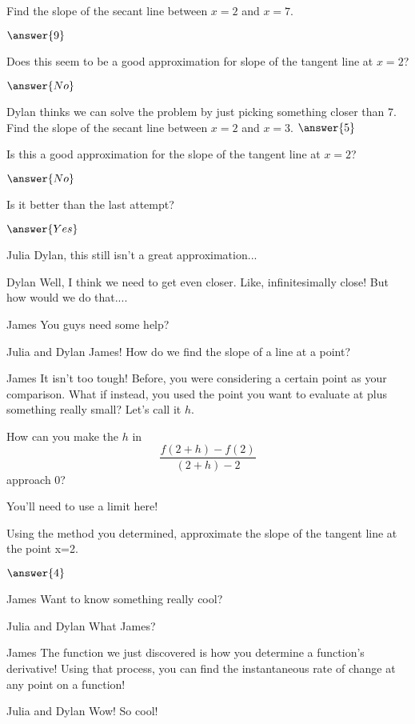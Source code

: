 \documentclass{ximera}
\begin{document}
\begin{question}
Find the slope of the secant line between $x = 2$ and $x = 7$.


$\answer{9}$

Does this seem to be a good approximation for slope of the tangent line at $x = 2$?

$\answer{No}$

Dylan thinks we can solve the problem by just picking something closer than 7. Find the slope of the secant line between $x = 2$ and $x = 3$.
$\answer{5}$

Is this a good approximation for the slope of the tangent line at $x=2$?

$\answer{No}$

Is it better than the last attempt?

$\answer{Yes}$
\end{question}
\begin{dialogue}
\item[Julia] Dylan, this still isn't a great approximation...
\item[Dylan] Well, I think we need to get even closer. Like, infinitesimally close! But how would we do that....
\item[James] You guys need some help?
\item[Julia and Dylan] James! How do we find the slope of a line at a point?
\item[James] It isn't too tough! Before, you were considering a certain point as your comparison. What if instead, you used the point you want to evaluate at plus something really small? Let's call it $h$.
\end{dialogue}
\begin{question}
How can you make the $h$ in $$\frac{f(2+h)-f(2)}{(2+h)-2}$$ approach 0?
\begin{hint}
You'll need to use a limit here!
\end{hint}
\begin{freeResponse}
\end{freeResponse}

Using the method you determined, approximate the slope of the tangent line at the point x=2.

$\answer{4}$

\end{question}
\begin{dialogue}
\item[James] Want to know something really cool?
\item[Julia and Dylan] What James?
\item[James] The function we just discovered is how you determine a function's derivative! Using that process, you can find the instantaneous rate of change at any point on a function!
\item[Julia and Dylan] Wow! So cool!
\end{dialogue}
\end{document}

